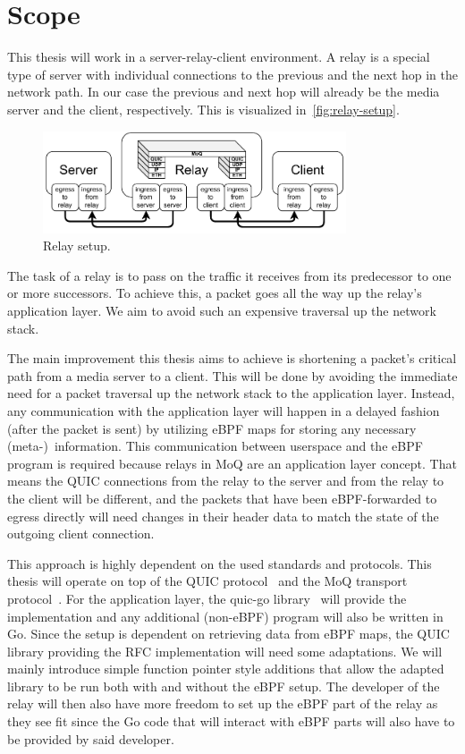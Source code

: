 \section{Scope}\label{sec:scope}

This thesis will work in a server-relay-client environment.
A relay is a special type of server with individual 
connections to the previous and the next hop in the network path.
In our case the previous and next hop will already be the media server and 
the client, respectively.
This is visualized in~\autoref{fig:relay-setup}.
\vspace{0.5cm}
\begin{figure}[H]
    \centering
    \includegraphics[width=0.8\textwidth]{figures/02_background/general-relay.drawio.pdf}
    \caption[Server-Relay-Client-Setup]{Relay setup.}\label{fig:relay-setup}
\end{figure}
The task of a relay is to pass on the traffic it receives from its predecessor
to one or more successors.
To achieve this, a packet goes all the way up the relay's application layer.
We aim to avoid such an expensive traversal up the network stack.

The main improvement this thesis aims to achieve is shortening a packet's critical path from a media server to a client.
This will be done by avoiding the immediate need for a packet traversal up the network stack to the application layer.
Instead, any communication with the application layer will happen in a delayed fashion (after the packet is sent) by utilizing 
eBPF maps for storing any necessary (meta-)~information.
This communication between userspace and the eBPF program is required because relays in MoQ are an application layer concept.
That means the QUIC connections from the relay to the server and from the relay to the client will be different, and the packets that have been eBPF-forwarded to egress directly will need changes in their header data to match the state of the outgoing client connection.  

This approach is highly dependent on the used standards and protocols.
This thesis will operate on top of the QUIC protocol~\parencite{rfc-9000} and the MoQ
transport protocol~\parencite{draft-moqtransport}.
For the application layer, the quic-go library~\parencite{quic-go-repo} will provide the implementation and 
any additional (non-eBPF) program will also be written in Go.
Since the setup is dependent on retrieving data from eBPF maps, the QUIC library providing the RFC implementation 
will need some adaptations.
We will mainly introduce simple function pointer style additions that allow the adapted library to be run 
both with and without the eBPF setup.
The developer of the relay will then also have more freedom to set up the eBPF part of the relay as they see fit
since the Go code that will interact with eBPF parts will also have to be provided by said developer.

